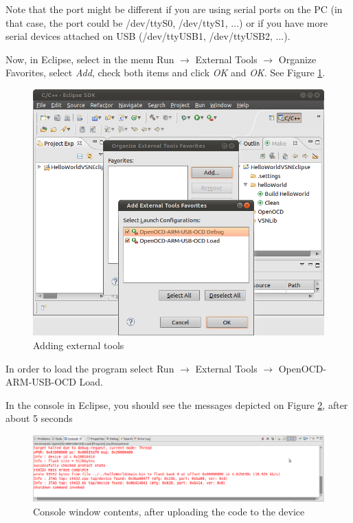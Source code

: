 \documentclass[a4paper, 10pt]{article}
\begin{document}
Note that the port might be different if you are using serial ports on the PC
(in that case, the port could be /dev/ttyS0, /dev/ttyS1, ...)
or if you have more serial devices attached on USB (/dev/ttyUSB1, /dev/ttyUSB2, ...).

Now, in Eclipse, select
in the menu 
Run $\rightarrow$ External Tools $\rightarrow$ Organize Favorites, 
select \emph{Add}, check both items and click \emph{OK} and \emph{OK}.
See Figure \ref{fig:compile-external-tools}.

    \begin{figure}[H]
    \centering
        \includegraphics[width=\textwidth]{./png-install-guide/compile-external-tools.png}
        \caption{Adding external tools}
        \label{fig:compile-external-tools}
    \end{figure}

In order to load the program select
Run $\rightarrow$ External Tools $\rightarrow$ OpenOCD-ARM-USB-OCD Load.

In the console in Eclipse, you should see the messages depicted on 
Figure \ref{fig:load-successful},
after about 5 seconds


    \begin{figure}[H]
    \centering
        \includegraphics[width=\textwidth]{./png-install-guide/load-successful.png}
        \caption{Console window contents, after uploading the code to the device}
        \label{fig:load-successful}
    \end{figure}
    
\end{document}
